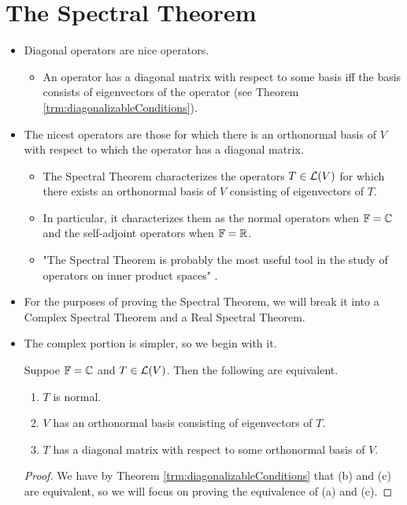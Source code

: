 \documentclass[../main.tex]{subfiles}
\begin{document}
\section{The Spectral Theorem}
\begin{itemize}
    \item Diagonal operators are nice operators.
    \begin{itemize}
        \item An operator has a diagonal matrix with respect to some basis iff the basis consists of eigenvectors of the operator (see Theorem \ref{trm:diagonalizableConditions}).
    \end{itemize}
    \item The nicest operators are those for which there is an orthonormal basis of $V$ with respect to which the operator has a diagonal matrix.
    \begin{itemize}
        \item The Spectral Theorem characterizes the operators $T\in\mathcal{L}(V)$ for which there exists an orthonormal basis of $V$ consisting of eigenvectors of $T$.
        \item In particular, it characterizes them as the normal operators when $\mathbb{F}=\mathbb{C}$ and the self-adjoint operators when $\mathbb{F}=\mathbb{R}$.
        \item "The Spectral Theorem is probably the most useful tool in the study of operators on inner product spaces" \parencite[217]{bib:Axler}.
    \end{itemize}
    \item For the purposes of proving the Spectral Theorem, we will break it into a Complex Spectral Theorem and a Real Spectral Theorem.
    \item The complex portion is simpler, so we begin with it.
    \begin{theorem}
        Suppoe $\mathbb{F}=\mathbb{C}$ and $T\in\mathcal{L}(V)$. Then the following are equivalent.
        \begin{enumerate}[label={\textup{(}\alph*\textup{)}}]
            \item $T$ is normal.
            \item $V$ has an orthonormal basis consisting of eigenvectors of $T$.
            \item $T$ has a diagonal matrix with respect to some orthonormal basis of $V$.
        \end{enumerate}
        \begin{proof}
            We have by Theorem \ref{trm:diagonalizableConditions} that (b) and (c) are equivalent, so we will focus on proving the equivalence of (a) and (c).\par

\end{proof}
\end{theorem}
\end{itemize}
\end{document}
